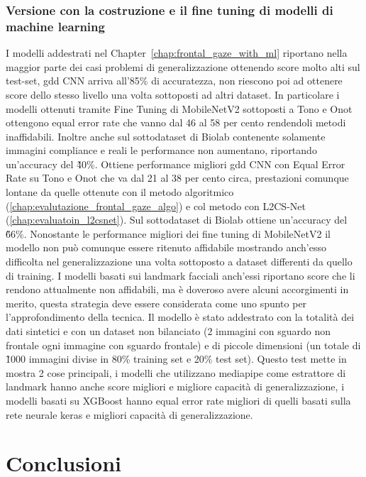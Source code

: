 \documentclass[12pt,a4paper,openright,twoside]{book}
\begin{document}
\subsection{Versione con la costruzione e il fine tuning di modelli di machine learning}
I modelli addestrati nel Chapter~\ref{chap:frontal_gaze_with_ml} riportano nella maggior parte dei casi problemi di generalizzazione ottenendo score molto alti sul test-set, gdd CNN arriva all'85\% di accuratezza, non riescono poi ad ottenere score dello stesso livello una volta sottoposti ad altri dataset. In particolare i modelli ottenuti tramite Fine Tuning di MobileNetV2 sottoposti a Tono e Onot ottengono equal error rate che vanno dal 46 al 58 per cento rendendoli metodi inaffidabili. Inoltre anche sul sottodataset di Biolab contenente solamente immagini compliance e reali le performance non aumentano, riportando un'accuracy del \~40\%.
Ottiene performance migliori gdd CNN con Equal Error Rate su Tono e Onot che va dal 21 al 38 per cento circa, prestazioni comunque lontane da quelle ottenute con il metodo algoritmico (\ref{chap:evalutazione_frontal_gaze_algo}) e col metodo con L2CS-Net (\ref{chap:evaluatoin_l2csnet}). Sul sottodataset di Biolab ottiene un'accuracy del \~66\%. Nonostante le performance migliori dei fine tuning di MobileNetV2 il modello non può comunque essere ritenuto affidabile mostrando anch'esso difficolta nel generalizzazione una volta sottoposto a dataset differenti da quello di training.
I modelli basati sui landmark facciali anch'essi riportano score che li rendono attualmente non affidabili, ma è doveroso avere alcuni accorgimenti in merito, questa strategia deve essere considerata come uno spunto per l'approfondimento della tecnica. Il modello è stato addestrato con la totalità dei dati sintetici e con un dataset non bilanciato (2 immagini con sguardo non frontale ogni immagine con sguardo frontale) e di piccole dimensioni (un totale di \~1000 immagini divise in 80\% training set e 20\% test set). Questo test mette in mostra 2 cose principali, i modelli che utilizzano mediapipe come estrattore di landmark hanno anche score migliori e migliore capacità di generalizzazione, i modelli basati su XGBoost hanno equal error rate migliori di quelli basati sulla rete neurale keras e migliori capacità di generalizzazione.


\chapter{Conclusioni}


\backmatter

\nocite{*} %



\end{document}

